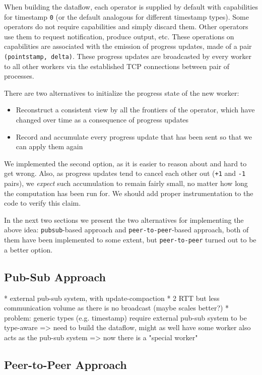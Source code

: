 \documentclass[12pt]{extarticle}
\begin{document}
When building the dataflow, each operator is supplied by default with capabilities for timestamp \verb|0| (or the default analogous for different
timestamp types). Some operators do not require capabilities and simply discard them. Other operators use them to request notification,
produce output, etc.
These operations on capabilities are associated with the emission of progress updates, made of a pair \verb|(pointstamp, delta)|.
These progress updates are broadcasted by every worker to all other workers via the established TCP connections between pair of processes.

There are two alternatives to initialize the progress state of the new worker:
\begin{itemize}
    \item Reconstruct a consistent view by all the frontiers of the operator, which have changed over time as a consequence of progress updates
    \item Record and accumulate every progress update that has been sent so that we can apply them again
\end{itemize}

We implemented the second option, as it is easier to reason about and hard to get wrong. Also,
as progress updates tend to cancel each other out (\verb|+1| and \verb|-1| pairs), we \textit{expect}
such accumulation to remain fairly small, no matter how long the computation has been run for.
We should add proper instrumentation to the code to verify this claim.

In the next two sections we present the two alternatives for implementing the above idea:
\verb|pubsub|-based approach and \verb|peer-to-peer|-based approach, both of them
have been implemented to some extent, but \verb|peer-to-peer| turned out to be a better option.

\subsection{Pub-Sub Approach}

* external pub-sub system, with update-compaction
* 2 RTT but less communication volume as there is no broadcast (maybe scales better?)
* problem: generic types (e.g. timestamp) require external pub-sub system to be type-aware
   => need to build the dataflow, might as well have some worker also acts as the pub-sub system
   => now there is a "special worker"

\subsection{Peer-to-Peer Approach}
\end{document}
